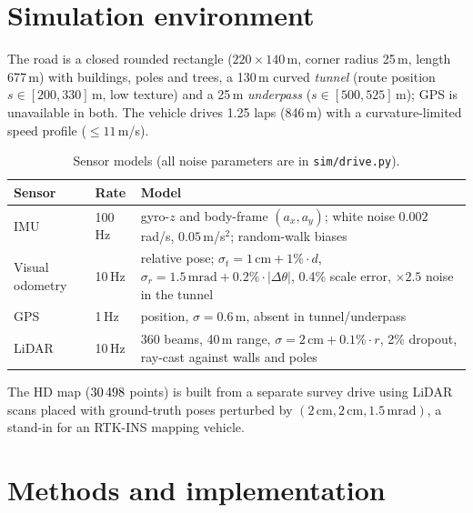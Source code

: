 \documentclass[11pt,a4paper]{article}
\begin{document}
\section{Simulation environment}
The road is a closed rounded rectangle ($220\times140$\,m, corner radius 25\,m, length 677\,m) with buildings, poles and trees, a 130\,m curved \emph{tunnel} (route position $s\in[200,330]$\,m, low texture) and a 25\,m \emph{underpass} ($s\in[500,525]$\,m); GPS is unavailable in both. The vehicle drives 1.25 laps (846\,m) with a curvature-limited speed profile ($\le11$\,m/s).

\begin{table}[H]\centering\small
\caption{Sensor models (all noise parameters are in \texttt{sim/drive.py}).}
\begin{tabular}{llp{8.4cm}}\toprule
Sensor & Rate & Model\\\midrule
IMU & 100\,Hz & gyro-$z$ and body-frame $(a_x,a_y)$; white noise $0.002$\,rad/s, $0.05$\,m/s$^2$; random-walk biases\\
Visual odometry & 10\,Hz & relative pose; $\sigma_t=1\,\text{cm}+1\%\cdot d$, $\sigma_r=1.5\,\text{mrad}+0.2\%\cdot|\Delta\theta|$, 0.4\% scale error, $\times2.5$ noise in the tunnel\\
GPS & 1\,Hz & position, $\sigma=0.6$\,m, absent in tunnel/underpass\\
LiDAR & 10\,Hz & 360 beams, 40\,m range, $\sigma=2\,\text{cm}+0.1\%\cdot r$, 2\% dropout, ray-cast against walls and poles\\\bottomrule
\end{tabular}\end{table}
The HD map ($30\,498$ points) is built from a separate survey drive using LiDAR scans placed with ground-truth poses perturbed by $(2\,\text{cm},2\,\text{cm},1.5\,\text{mrad})$, a stand-in for an RTK-INS mapping vehicle.

\section{Methods and implementation}
\end{document}
